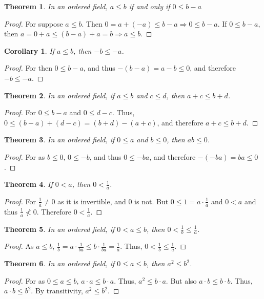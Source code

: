 \documentclass[12pt,oneside]{book}
\theoremstyle{mystyle}
\newtheorem{theorem}{Theorem}[section]
\newtheorem{corollary}{Corollary}[section]
\begin{document}
\begin{theorem}
In an ordered field, $a\leq b$ if and only if $0 \leq b-a$
\end{theorem}
\begin{proof}
For suppose $a\leq b$. Then $0=a+(-a)\leq b-a\Rightarrow 0 \leq b-a$. If $0\leq b-a$, then $a=0+a \leq (b-a)+a = b\Rightarrow a\leq b$.
\end{proof}

\begin{corollary}
If $a\leq b$, then $-b\leq -a$.
\end{corollary}
\begin{proof}
For then $0 \leq b-a$, and thus $-(b-a)=a-b\leq 0$, and therefore $-b \leq -a$.
\end{proof}

\begin{theorem}
In an ordered field, if $a\leq b$ and $c\leq d$, then $a+c \leq b+d$.
\end{theorem}
\begin{proof}
For $0\leq b-a$ and $0\leq d-c$. Thus, $0\leq (b-a)+(d-c)= (b+d)-(a+c)$, and therefore $a+c \leq b+d$.
\end{proof}

\begin{theorem}
In an ordered field, if $0\leq a$ and $b\leq 0$, then $ab\leq 0$.
\end{theorem}
\begin{proof}
For as $b\leq 0$, $0\leq -b$, and thus $0\leq -ba$, and therefore $-(-ba) = ba \leq 0$.
\end{proof}

\begin{theorem}
If $0< a$, then $0<\frac{1}{a}$.
\end{theorem}
\begin{proof}
For $\frac{1}{a}\ne 0$ as it is invertible, and $0$ is not. But $0\leq1=a\cdot \frac{1}{a}$ and $0<a$ and thus $\frac{1}{a} \not <0$. Therefore $0<\frac{1}{a}$.
\end{proof}

\begin{theorem}
In an ordered field, if $0<a\leq b$, then $0<\frac{1}{b}\leq\frac{1}{a}$.
\end{theorem}
\begin{proof}
As $a\leq b$, $\frac{1}{b}=a\cdot \frac{1}{ba} \leq b\cdot \frac{1}{ba}=\frac{1}{a}$. Thus, $0< \frac{1}{b}\leq \frac{1}{a}$.
\end{proof}

\begin{theorem}
In an ordered field, if $0 \leq a \leq b$, then $a^2 \leq b^2$.
\end{theorem}
\begin{proof}
For as $0\leq a \leq b$, $a\cdot a \leq b\cdot a$. Thus, $a^2 \leq b \cdot a$. But also $a\cdot b \leq b\cdot b$. Thus, $a\cdot b \leq b^2$. By transitivity, $a^2 \leq b^2$.
\end{proof}
\end{document}
